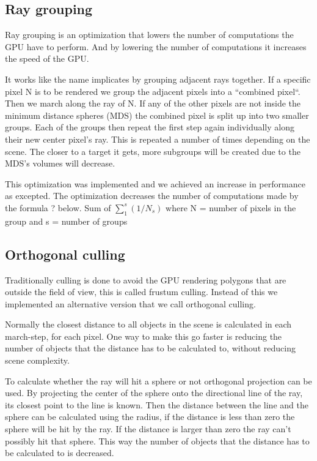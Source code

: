 		\subsection{Ray grouping}
		
			Ray grouping is an optimization that lowers the number of
			computations the GPU have to perform. And by lowering the number of
			computations it increases the speed of the GPU.
			
			It works like the name implicates by grouping adjacent rays
			together. If a specific pixel N is to be rendered we group the
			adjacent pixels into a ``combined pixel``. Then we march along the
			ray of N. If any of the other pixels are not inside the minimum
			distance spheres (MDS) the combined pixel is split up into two
			smaller groups. Each of the groups then repeat the first step again
			individually along their new center pixel's ray. This is repeated a
			number of times depending on the scene.  The closer to a target it
			gets, more subgroups will be created due to the MDS's volumes will
			decrease.
			
			This optimization was implemented and we achieved an increase in
			performance as excepted. The optimization decreases the number of
			computations made by the formula ? below.  Sum of $\sum_1^s(1/N_s)$
			where N = number of pixels in the group and s = number of groups


		\subsection{Orthogonal culling}

			Traditionally culling is done to avoid the GPU rendering polygons 
			that are outside the field of view, this is called frustum culling. Instead 
			of this we implemented an alternative version that we call orthogonal
			culling.

			Normally the closest distance to all objects in the scene is calculated
			in each march-step, for each pixel. One way to make this go faster is 
			reducing the number of objects that the distance has to be calculated 
			to, without reducing scene complexity. 

			To calculate whether the ray will hit a sphere or not orthogonal 
			projection can be used. By projecting the center of the sphere onto
			the directional line of the ray, its closest point to the line is known.
			Then the distance between the line and the sphere can be calculated using
			the radius, if the distance is less than zero the sphere will be hit
			by the ray. If the distance is larger than zero the ray can't possibly hit 
			that sphere. This way the number of objects that the distance has to be 
			calculated to is decreased. 

